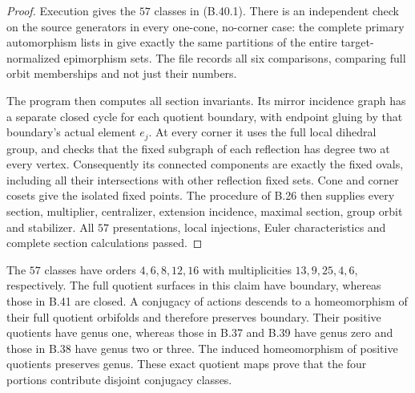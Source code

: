 \begin{proof}
Execution gives the $57$ classes in (B.40.1).  There is an independent
check on the source generators in every one-cone, no-corner case:
the complete primary automorphism lists in
\cite[Lemmas 3.7 and 3.8]{C_GromadzkiSzepietowski2016} give exactly the
same partitions of the entire target-normalized epimorphism sets.
The file 
records all six comparisons, comparing full orbit memberships and
not just their numbers.

The program then computes all section invariants.  Its mirror
incidence graph has a separate closed cycle for each quotient
boundary, with endpoint gluing by that boundary's actual element
$e_j$.  At every corner it uses the full local dihedral group, and
checks that the fixed subgraph of each reflection has degree two
at every vertex.  Consequently its connected components are exactly
the fixed ovals, including all their intersections with other
reflection fixed sets.  Cone and corner cosets give the isolated
fixed points.  The procedure of B.26 then supplies every section,
multiplier, centralizer, extension incidence, maximal section, group
orbit and stabilizer.  All $57$ presentations, local injections,
Euler characteristics and complete section calculations passed.
\end{proof}

The $57$ classes have orders $4,6,8,12,16$ with multiplicities
$13,9,25,4,6$, respectively.  The full quotient surfaces in this
claim have boundary, whereas those in B.41 are closed.  A conjugacy
of actions descends to a homeomorphism of their full quotient
orbifolds and therefore preserves boundary.  Their positive
quotients have genus one, whereas those in B.37 and B.39 have genus
zero and those in B.38 have genus two or three.  The induced
homeomorphism of positive quotients preserves genus.  These exact
quotient maps prove that the four portions contribute disjoint
conjugacy classes.
